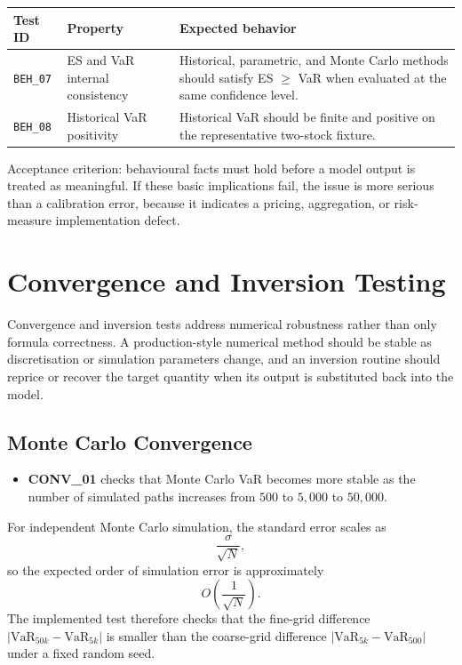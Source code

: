\documentclass[11pt]{article}
\newcommand{\code}[1]{\texttt{#1}}
\begin{document}
\begin{center}
\begin{tabular}{L{2.2cm}L{4.8cm}L{6cm}}
\toprule
\textbf{Test ID} & \textbf{Property} & \textbf{Expected behavior} \\
\midrule
\code{BEH\_07} & ES and VaR internal consistency & Historical, parametric, and Monte Carlo methods should satisfy ES $\geq$ VaR when evaluated at the same confidence level. \\
\code{BEH\_08} & Historical VaR positivity & Historical VaR should be finite and positive on the representative two-stock fixture. \\
\bottomrule
\end{tabular}
\end{center}

Acceptance criterion: behavioural facts must hold before a model output is
treated as meaningful.  If these basic implications fail, the issue is
more serious than a calibration error, because it indicates a pricing,
aggregation, or risk-measure implementation defect.

\section{Convergence and Inversion Testing}
\label{sec:convergence-inversion}

Convergence and inversion tests address numerical robustness rather than
only formula correctness.  A production-style numerical method should
be stable as discretisation or simulation parameters change, and an
inversion routine should reprice or recover the target quantity when
its output is substituted back into the model.

\subsection{Monte Carlo Convergence}

\begin{itemize}
  \item \textbf{CONV\_01} checks that Monte Carlo VaR becomes more stable
    as the number of simulated paths increases from $500$ to $5{,}000$
    to $50{,}000$.
\end{itemize}

For independent Monte Carlo simulation, the standard error scales as
\[
  \frac{\sigma}{\sqrt{N}},
\]
so the expected order of simulation error is approximately
\[
  O\left(\frac{1}{\sqrt{N}}\right).
\]
The implemented test therefore checks that the fine-grid difference
$|\mathrm{VaR}_{50k} - \mathrm{VaR}_{5k}|$ is smaller than the coarse-grid
difference $|\mathrm{VaR}_{5k} - \mathrm{VaR}_{500}|$ under a fixed random
seed.
\end{document}
